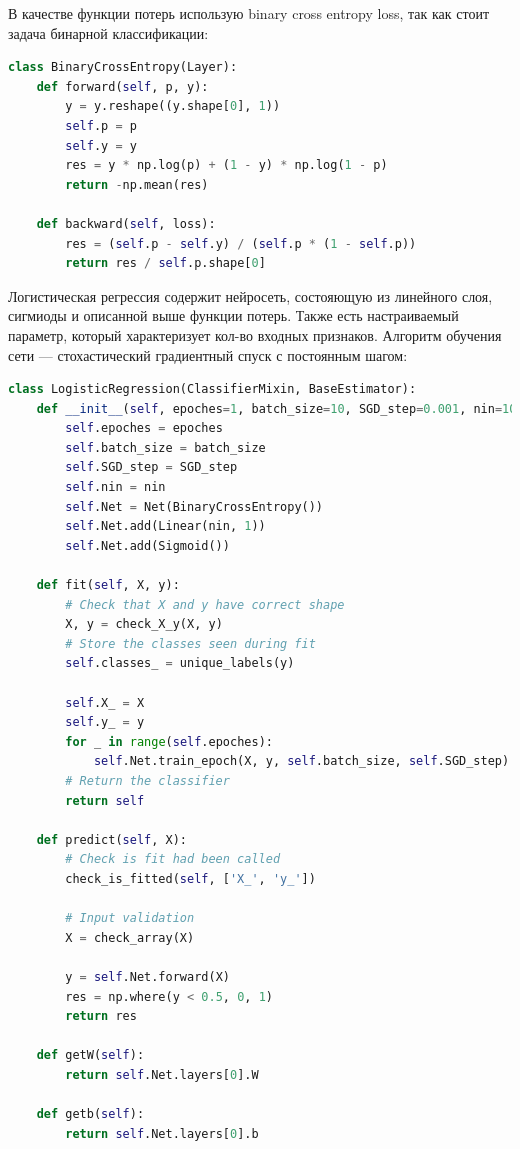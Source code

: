 В качестве функции потерь использую binary cross entropy loss, так как стоит задача бинарной классификации:
\begin{lstlisting}[language=Python]
class BinaryCrossEntropy(Layer):
    def forward(self, p, y):
        y = y.reshape((y.shape[0], 1))
        self.p = p
        self.y = y
        res = y * np.log(p) + (1 - y) * np.log(1 - p)
        return -np.mean(res)

    def backward(self, loss):
        res = (self.p - self.y) / (self.p * (1 - self.p))
        return res / self.p.shape[0]
\end{lstlisting}
Логистическая регрессия содержит нейросеть, состояющую из линейного слоя, сигмиоды и описанной выше функции потерь. Также есть настраиваемый 
параметр, который характеризует кол-во входных признаков.
Алгоритм обучения сети --- стохастический градиентный спуск с постоянным шагом:
\begin{lstlisting}[language=Python]
class LogisticRegression(ClassifierMixin, BaseEstimator):
    def __init__(self, epoches=1, batch_size=10, SGD_step=0.001, nin=10):
        self.epoches = epoches
        self.batch_size = batch_size
        self.SGD_step = SGD_step
        self.nin = nin
        self.Net = Net(BinaryCrossEntropy())
        self.Net.add(Linear(nin, 1))
        self.Net.add(Sigmoid())

    def fit(self, X, y):
        # Check that X and y have correct shape
        X, y = check_X_y(X, y)
        # Store the classes seen during fit
        self.classes_ = unique_labels(y)

        self.X_ = X
        self.y_ = y
        for _ in range(self.epoches):
            self.Net.train_epoch(X, y, self.batch_size, self.SGD_step)
        # Return the classifier
        return self

    def predict(self, X):
        # Check is fit had been called
        check_is_fitted(self, ['X_', 'y_'])

        # Input validation
        X = check_array(X)

        y = self.Net.forward(X)
        res = np.where(y < 0.5, 0, 1)
        return res

    def getW(self):
        return self.Net.layers[0].W

    def getb(self):
        return self.Net.layers[0].b
\end{lstlisting}
\pagebreak

